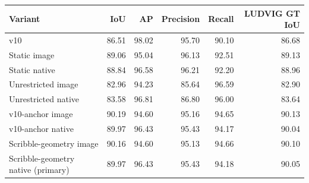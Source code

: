 \begin{tabular}{lrrrrr}
\toprule
Variant & IoU & AP & Precision & Recall & LUDVIG GT IoU \\\midrule
v10 & 86.51 & 98.02 & 95.70 & 90.10 & 86.68 \\
Static image & 89.06 & 95.04 & 96.13 & 92.51 & 89.13 \\
Static native & 88.84 & 96.58 & 96.21 & 92.20 & 88.96 \\
Unrestricted image & 82.96 & 94.23 & 85.64 & 96.59 & 82.90 \\
Unrestricted native & 83.58 & 96.81 & 86.80 & 96.00 & 83.64 \\
v10-anchor image & 90.19 & 94.60 & 95.16 & 94.65 & 90.13 \\
v10-anchor native & 89.97 & 96.43 & 95.43 & 94.17 & 90.04 \\
Scribble-geometry image & 90.16 & 94.60 & 95.13 & 94.66 & 90.10 \\
Scribble-geometry native (primary) & 89.97 & 96.43 & 95.43 & 94.18 & 90.05 \\
\bottomrule
\end{tabular}
